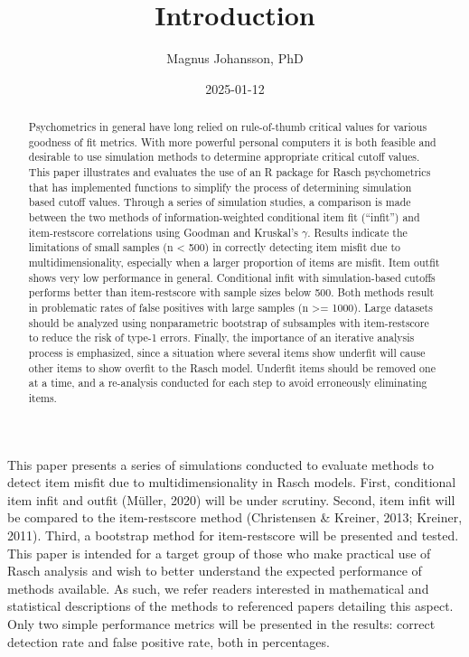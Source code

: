\documentclass[
  letterpaper,
  DIV=11,
  numbers=noendperiod]{scrartcl}
\title{Introduction}
\author{Magnus Johansson, PhD}
\date{2025-01-12}
\begin{document}
\maketitle
\begin{abstract}
Psychometrics in general have long relied on rule-of-thumb critical
values for various goodness of fit metrics. With more powerful personal
computers it is both feasible and desirable to use simulation methods to
determine appropriate critical cutoff values. This paper illustrates and
evaluates the use of an R package for Rasch psychometrics that has
implemented functions to simplify the process of determining simulation
based cutoff values. Through a series of simulation studies, a
comparison is made between the two methods of information-weighted
conditional item fit (``infit'') and item-restscore correlations using
Goodman and Kruskal's \(\gamma\). Results indicate the limitations of
small samples (n \textless{} 500) in correctly detecting item misfit due
to multidimensionality, especially when a larger proportion of items are
misfit. Item outfit shows very low performance in general. Conditional
infit with simulation-based cutoffs performs better than item-restscore
with sample sizes below 500. Both methods result in problematic rates of
false positives with large samples (n \textgreater= 1000). Large
datasets should be analyzed using nonparametric bootstrap of subsamples
with item-restscore to reduce the risk of type-1 errors. Finally, the
importance of an iterative analysis process is emphasized, since a
situation where several items show underfit will cause other items to
show overfit to the Rasch model. Underfit items should be removed one at
a time, and a re-analysis conducted for each step to avoid erroneously
eliminating items.
\end{abstract}


This paper presents a series of simulations conducted to evaluate
methods to detect item misfit due to multidimensionality in Rasch
models. First, conditional item infit and outfit (Müller, 2020) will be
under scrutiny. Second, item infit will be compared to the
item-restscore method (Christensen \& Kreiner, 2013; Kreiner, 2011).
Third, a bootstrap method for item-restscore will be presented and
tested. This paper is intended for a target group of those who make
practical use of Rasch analysis and wish to better understand the
expected performance of methods available. As such, we refer readers
interested in mathematical and statistical descriptions of the methods
to referenced papers detailing this aspect. Only two simple performance
metrics will be presented in the results: correct detection rate and
false positive rate, both in percentages.
\end{document}
